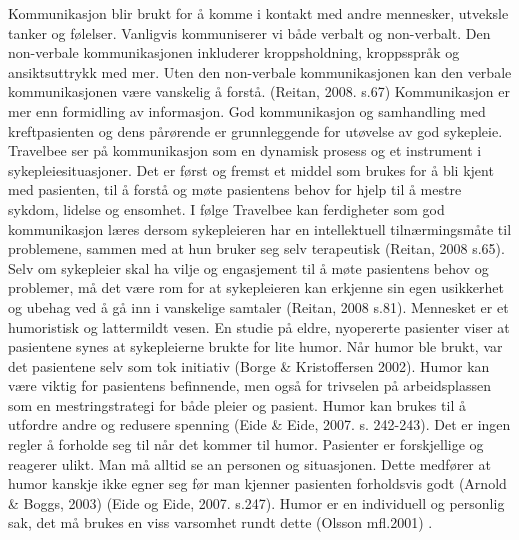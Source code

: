 Kommunikasjon blir brukt for å komme i kontakt med andre mennesker, utveksle
tanker og følelser. Vanligvis kommuniserer vi både verbalt og non-verbalt. Den
non-verbale kommunikasjonen inkluderer kroppsholdning, kroppsspråk og
ansiktsuttrykk med mer. Uten den non-verbale kommunikasjonen kan den verbale
kommunikasjonen være vanskelig å forstå. (Reitan, 2008. s.67) Kommunikasjon er
mer enn formidling av informasjon. God kommunikasjon og samhandling med
kreftpasienten og dens pårørende er grunnleggende for utøvelse av god
sykepleie. Travelbee ser på kommunikasjon som en dynamisk prosess og et
instrument i sykepleiesituasjoner. Det er først og fremst et middel som brukes
for å bli kjent med pasienten, til å forstå og møte pasientens behov for hjelp
til å mestre sykdom, lidelse og ensomhet. I følge Travelbee kan ferdigheter som
god kommunikasjon læres dersom sykepleieren har en intellektuell
tilnærmingsmåte til problemene, sammen med at hun bruker seg selv terapeutisk
(Reitan, 2008 s.65). Selv om sykepleier skal ha vilje og engasjement til å møte
pasientens behov og problemer, må det være rom for at sykepleieren kan erkjenne
sin egen usikkerhet og ubehag ved å gå inn i vanskelige samtaler (Reitan, 2008
s.81).  Mennesket er et humoristisk og lattermildt vesen. En studie på eldre,
nyopererte pasienter viser at pasientene synes at sykepleierne brukte for lite
humor. Når humor ble brukt, var det pasientene selv som tok initiativ (Borge
\&{}
Kristoffersen 2002). Humor kan være viktig for pasientens befinnende, men også
for trivselen på arbeidsplassen som en mestringstrategi for både pleier og
pasient. Humor kan brukes til å utfordre andre og redusere spenning (Eide \&{}
Eide, 2007. s. 242-243).  Det er ingen regler å forholde seg til når det kommer
til humor. Pasienter er forskjellige og reagerer ulikt. Man må alltid se an
personen og situasjonen. Dette medfører at humor kanskje ikke egner seg før man
kjenner pasienten forholdsvis godt (Arnold \&{} Boggs, 2003) (Eide og Eide, 2007.
s.247). Humor er en individuell og personlig sak, det må brukes en viss
varsomhet rundt dette (Olsson mfl.2001) \cite[s.~394]{bjork2011}.


